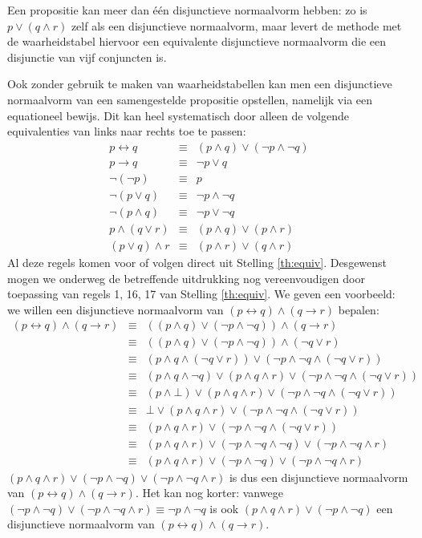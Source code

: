 Een propositie kan meer dan \'e\'en disjunctieve normaalvorm hebben: zo is $p\lor(q\land r)$ zelf als een disjunctieve normaalvorm, maar levert de methode met de waarheidstabel hiervoor een equivalente disjunctieve normaalvorm die een disjunctie van vijf conjuncten is.

Ook zonder gebruik te maken van waarheidstabellen kan men een disjunctieve normaalvorm van een samengestelde propositie opstellen, namelijk via een equationeel bewijs. Dit kan heel systematisch door alleen de volgende equivalenties van links naar rechts toe te passen:
\begin{eqnarray*}
p\leftrightarrow q & \equiv & (p\land q)\lor (\neg p\land\neg q) \\
p\rightarrow q & \equiv & \neg p\lor q \\
\neg(\neg p) & \equiv & p \\
\neg(p\lor q) & \equiv & \neg p\land\neg q \\
\neg(p\land q) & \equiv & \neg p\lor\neg q \\
p\land(q\lor r) & \equiv & (p\land q)\lor(p\land r) \\
(p\lor q)\land r & \equiv & (p\land r)\lor(q\land r)
\end{eqnarray*}
Al deze regels komen voor of volgen direct uit Stelling \ref{th:equiv}. Desgewenst mogen we onderweg de betreffende uitdrukking nog vereenvoudigen door toepassing van regels 1, 16, 17 van Stelling \ref{th:equiv}. We geven een voorbeeld: we willen een disjunctieve normaalvorm van $(p\leftrightarrow q)\land(q\rightarrow r)$ bepalen:
\begin{eqnarray*}
(p\leftrightarrow q)\land(q\rightarrow r) 
  & \equiv & ((p\land q)\lor(\neg p\land\neg q))\land(q\rightarrow r) \\
  & \equiv & ((p\land q)\lor(\neg p\land\neg q))\land(\neg q\lor r) \\
  & \equiv & (p\land q\land(\neg q\lor r))\lor(\neg p\land\neg q\land(\neg q\lor r)) \\
  & \equiv & (p\land q\land\neg q)\lor(p\land q\land r)\lor(\neg p\land\neg q\land(\neg q\lor r)) \\
  & \equiv & (p\land\bot)\lor(p\land q\land r)\lor(\neg p\land\neg q\land(\neg q\lor r)) \\
  & \equiv & \bot\lor(p\land q\land r)\lor(\neg p\land\neg q\land(\neg q\lor r)) \\
  & \equiv & (p\land q\land r)\lor(\neg p\land\neg q\land(\neg q\lor r)) \\
  & \equiv & (p\land q\land r)\lor(\neg p\land \neg q\land\neg q)\lor(\neg p\land\neg q\land r) \\
  & \equiv & (p\land q\land r)\lor(\neg p\land\neg q)\lor(\neg p\land\neg q\land r)
\end{eqnarray*}
$(p\land q\land r)\lor(\neg p\land\neg q)\lor(\neg p\land\neg q\land r)$ is dus een disjunctieve normaalvorm van $(p\leftrightarrow q)\land(q\rightarrow r)$. Het kan nog korter: vanwege $(\neg p\land\neg q)\lor(\neg p\land\neg q\land r)\equiv\neg p\land\neg q$ is ook $(p\land q\land r)\lor(\neg p\land\neg q)$ een disjunctieve normaalvorm van $(p\leftrightarrow q)\land(q\rightarrow r)$.


